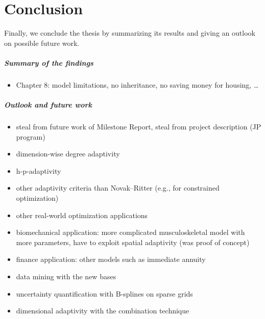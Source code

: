 \chapter{Conclusion}
\label{chap:90conclusion}

\noindent
Finally, we conclude the thesis by summarizing its results
and giving an outlook on possible future work.

\paragraph{Summary of the findings}


\begin{itemize}
  \item
  Chapter 8: model limitations, no inheritance,
  no saving money for housing, \dots
\end{itemize}

\dummytext[6]{}

\paragraph{Outlook and future work}


\begin{itemize}
  \item
  steal from future work of Milestone Report,
  steal from project description (JP program)
  
  \item
  dimension-wise degree adaptivity
  
  \item
  h-p-adaptivity
  
  \item
  other adaptivity criteria than Novak--Ritter
  (e.g., for constrained optimization)
  
  \item
  other real-world optimization applications
  
  \item
  biomechanical application: more complicated musculoskeletal model
  with more parameters, have to exploit spatial adaptivity
  (was proof of concept)
  
  \item
  finance application: other models such as immediate annuity
  
  \item
  data mining with the new bases
  
  \item
  uncertainty quantification with B-splines on sparse grids
  
  \item
  dimensional adaptivity with the combination technique
\end{itemize}

\dummytext[6]{}

\cleardoublepage
